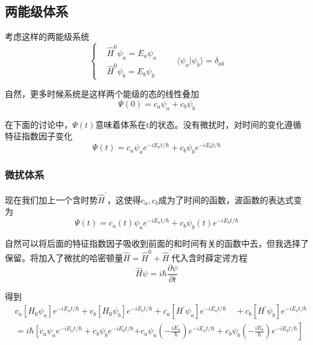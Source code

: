 \documentclass[UTF8]{ctexart}
\begin{document}
    \subsection{两能级体系}
    考虑这样的两能级系统
    \begin{equation}
        \left\{\begin{aligned}
            &\hat{H}^0 \psi_a= E_a \psi_a \\ 
            &\hat{H}^0 \psi_b=E_b \psi_b
        \end{aligned}\right. \qquad 
        \langle \psi_a | \psi_b \rangle =\delta_{ab} \label{equ7.1}
    \end{equation}

\noindent 自然，更多时候系统是这样两个能级的态的线性叠加
\begin{equation}
    \Psi(0) = c_a \psi_a + c_b \psi_b
\end{equation}

\noindent 在下面的讨论中，$\Psi(t)$意味着体系在t的状态。没有微扰时，对时间的变化遵循特征指数因子变化
\begin{equation}
    \Psi(t)=c_{a} \psi_{a} e^{-i E_{a} t / \hbar}+c_{b} \psi_{b} e^{-i E_{b} t / \hbar}
\end{equation}

    \subsubsection{微扰体系}
    现在我们加上一个含时势$\hat{H}^{\prime}$，这使得$c_a,c_b$成为了时间的函数，波函数的表达式变为
    \begin{equation}
        \Psi(t)=c_{a}(t) \psi_{a} e^{-i E_{a} t / \hbar}+c_{b} \psi_{b}(t) e^{-i E_{b} t / \hbar}
    \end{equation}

\noindent 自然可以将后面的特征指数因子吸收到前面的和时间有关的函数中去，但我选择了保留。将加入了微扰的哈密顿量$\hat{H} = \hat{H}^0 + \hat{H}^{\prime}$代入含时薛定谔方程
\begin{equation}
    \hat{H} \psi = i \hbar \frac{\partial \psi}{\partial t}
\end{equation}

\noindent 得到
\begin{equation}
    \begin{aligned}
        &c_{a}\left[H_{0} \psi_{a}\right] e^{-i E_{a} t / \hbar}+c_{b}\left[H_{0} \psi_{b}\right] e^{-i E_{b} t / \hbar}+c_{a}\left[H^{\prime} \psi_{a}\right] e^{-i E_{a} t / \hbar}
        \quad+c_{b}\left[H^{\prime} \psi_{b}\right] e^{-i E_{b} t / \hbar}\\
        &=i \hbar\left[\dot{c}_{a} \psi_{a} e^{-i E_{a} t / \hbar}+\dot{c}_{b} \psi_{b} e^{-i E_{b} t / \hbar}\right. 
        \left.+c_{a} \psi_{a}\left(-\frac{i E_{a}}{\hbar}\right) e^{-i E_{a} t / \hbar}+c_{b} \psi_{b}\left(-\frac{i E_{b}}{\hbar}\right) e^{-i E_{b} t / \hbar}\right]
        \end{aligned}
\end{equation}
\end{document}
